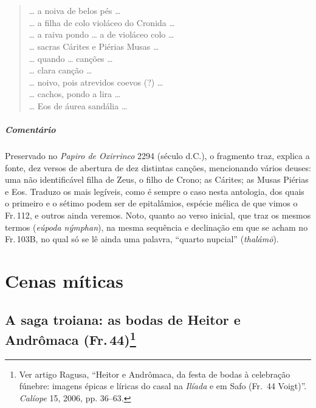 \chapter*{}
\section*{}
\begin{verse}
\ldots{} a noiva de belos pés \ldots{}\\[8pt]
\ldots{} a filha de colo violáceo do Cronida \ldots{}\\[8pt]
\ldots{} a raiva pondo \ldots{} a de violáceo colo \ldots{}\\[8pt]
\ldots{} sacras Cárites e Piérias Musas \ldots{}\\[8pt]
\ldots{} quando \ldots{} canções \ldots{}\\[8pt]
\ldots{} clara canção \ldots{}\\[8pt]
\ldots{} noivo, pois atrevidos coevos (?) \ldots{}\\[8pt]
\ldots{} cachos, pondo a lira \ldots{}\\[8pt]
\ldots{} Eos de áurea sandália \ldots{}\\[8pt]
\end{verse}

{\paragraph{Comentário} Preservado  no \textit{Papiro de Oxirrinco} 2294 (século  d.C.), o fragmento traz, explica a fonte, dez versos de abertura de dez distintas canções, mencionando vários deuses: uma não identificável filha de Zeus, o filho de Crono; as Cárites; as Musas Piérias e Eos. Traduzo os mais legíveis, como é sempre o caso nesta antologia, dos quais o primeiro e o sétimo podem ser de epitalâmios, espécie mélica de que vimos o Fr.\,112, e outros ainda veremos.
Noto, quanto ao verso inicial, que traz os mesmos termos (\textit{eúpoda nýmphan}), na mesma sequência e declinação em que se acham no Fr.\,103B, no qual só se lê ainda uma palavra, ``quarto nupcial'' (\textit{thalámō}).}


\chapter{Cenas míticas}

\section[A saga troiana: as bodas de Heitor e Andrômaca (Fr.\,44)]{A saga troiana: as bodas de Heitor e\\ Andrômaca (Fr.\,44)\protect\footnote{\MakeUppercase{V}er
artigo \MakeUppercase{R}agusa, “\MakeUppercase{H}eitor e \MakeUppercase{A}ndrômaca, da festa de bodas à celebração fúnebre:
imagens épicas e líricas do casal na \textit{\MakeUppercase{I}líada} e em \MakeUppercase{S}afo (\MakeUppercase{F}r.~44 Voigt)”.
\textit{\MakeUppercase{C}alíope} 15, 2006, pp. 36--63.}}

